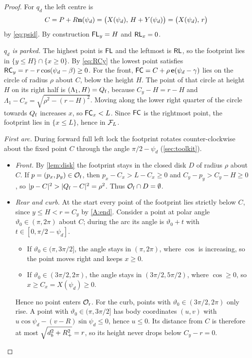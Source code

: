 \begin{proof}
For $q_d$ the left centre is
\[
  C=P+R\mathbf{n}(\psi_d)=\big(X(\psi_d),\,H+Y(\psi_d)\big)=\big(X(\psi_d),\,r\big)
\]
by \eqref{eq:psid}.
By construction $\mathsf{FL}_y=H$ and $\mathsf{RL}_x=0$.

\emph{$q_d$ is parked.}
The highest point is $\mathsf{FL}$ and the leftmost is $\mathsf{RL}$, so the footprint lies in $\{y\le H\}\cap\{x\ge0\}$.
By \eqref{eq:RCy} the lowest point satisfies $\mathsf{RC}_y=r-r\cos(\psi_d-\beta)\ge0$.
For the front, $\mathsf{FC}=C+\rho\,\mathbf{e}(\psi_d-\gamma)$ lies on the circle of radius $\rho$ about $C$, below the height $H$.
The point of that circle at height $H$ on its right half is $(\Lambda_1,H)=Q_{\mathrm f}$, because $C_y-H=r-H$ and $\Lambda_1-C_x=\sqrt{\rho^2-(r-H)^2}$.
Moving along the lower right quarter of the circle towards $Q_{\mathrm f}$ increases $x$, so $\mathsf{FC}_x<L$.
Since $\mathsf{FC}$ is the rightmost point, the footprint lies in $\{x\le L\}$, hence in $\mathcal{F}_L$.

\emph{First arc.}
During forward full left lock the footprint rotates counter-clockwise about the fixed point $C$ through the angle $\pi/2-\psi_d$ (\cref{sec:toolkit}).
\begin{itemize}[nosep]
\item \emph{Front.} By \cref{lem:disk} the footprint stays in the closed disk $D$ of radius $\rho$ about $C$.
If $p=(p_x,p_y)\in\mathcal{O}_{\mathrm f}$, then $p_x-C_x>L-C_x\ge0$ and $C_y-p_y>C_y-H\ge0$, so $|p-C|^2>|Q_{\mathrm f}-C|^2=\rho^2$.
Thus $\mathcal{O}_{\mathrm f}\cap D=\emptyset$.
\item \emph{Rear and curb.} At the start every point of the footprint lies strictly below $C$, since $y\le H<r=C_y$ by \ref{A:end}.
Consider a point at polar angle $\vartheta_0\in(\pi,2\pi)$ about $C$; during the arc its angle is $\vartheta_0+t$ with $t\in[0,\pi/2-\psi_d]$.
\begin{itemize}[nosep]
\item If $\vartheta_0\in(\pi,3\pi/2]$, the angle stays in $(\pi,2\pi)$, where $\cos$ is increasing, so the point moves right and keeps $x\ge0$.
\item If $\vartheta_0\in(3\pi/2,2\pi)$, the angle stays in $(3\pi/2,5\pi/2)$, where $\cos\ge0$, so $x\ge C_x=X(\psi_d)\ge0$.
\end{itemize}
Hence no point enters $\mathcal{O}_{\mathrm r}$.
For the curb, points with $\vartheta_0\in(3\pi/2,2\pi)$ only rise.
A point with $\vartheta_0\in(\pi,3\pi/2]$ has body coordinates $(u,v)$ with $u\cos\psi_d-(v-R)\sin\psi_d\le0$, hence $u\le0$.
Its distance from $C$ is therefore at most $\sqrt{d_b^2+R_{+}^2}=r$, so its height never drops below $C_y-r=0$.
\end{itemize}


\end{proof}
